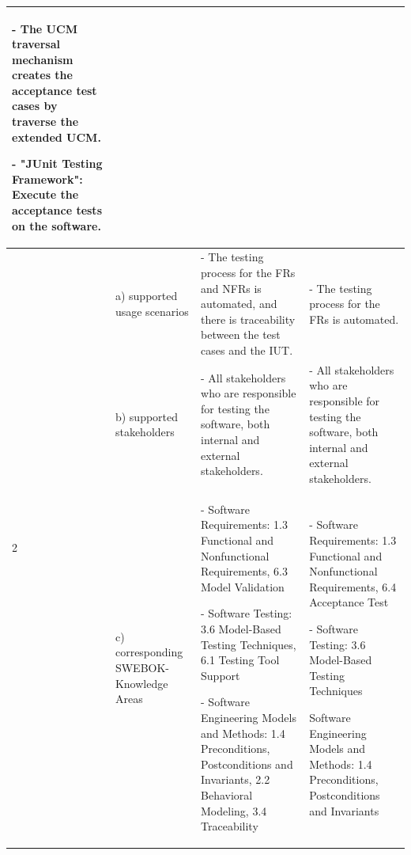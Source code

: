 \begin{landscape}
\begin{table}
\begin{longtable}[h]{|p{1.3cm}|>{\raggedright}p{2.8cm}|>{}p{9.1cm}|>{}p{9.1cm}|}
			- The UCM traversal mechanism creates the acceptance test cases by traverse the extended UCM.
			
			- "JUnit Testing Framework": Execute the acceptance tests on the software.
			\\
			\hline %
			\multirow{3}{*}{2 \rotatebox[origin=r]{90}{\textbf{Benefits}}} 
			& a) supported usage scenarios 
			& - The testing process for the FRs and NFRs is automated, and there is traceability between the test cases and the IUT. 
			& - The testing process for the FRs is automated. \\ 
			\cline{2-4}
			& b) supported stakeholders 
			& - All stakeholders who are responsible for testing the software, both internal and external stakeholders.
			& - All stakeholders who are responsible for testing the software, both internal and external stakeholders.\\ 
			\cline{2-4}
			& c) corresponding SWEBOK-Knowledge Areas
			& - Software Requirements: 1.3 Functional and Nonfunctional Requirements, 6.3 Model Validation
			
			- Software Testing: 3.6 Model-Based Testing Techniques, 6.1 Testing Tool Support
			
			- Software Engineering Models and Methods: 1.4 Preconditions, Postconditions and Invariants, 2.2 Behavioral Modeling, 3.4 Traceability 
			&
			- Software Requirements: 1.3 Functional and Nonfunctional Requirements, 6.4 Acceptance Test
			
			- Software Testing: 3.6 Model-Based Testing Techniques
			
			Software Engineering Models and Methods: 1.4 Preconditions, Postconditions and Invariants\\
			\hline %
		\end{longtable}
		\label{tab:08_syntheseMatrix1}
	\end{table}
\end{landscape}
\restoregeometry

